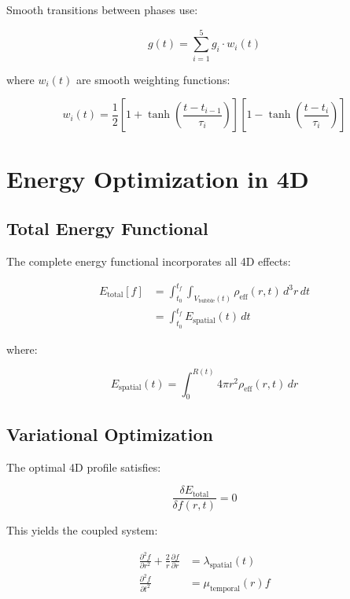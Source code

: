 \documentclass[12pt,a4paper]{article}
\begin{document}
Smooth transitions between phases use:

\begin{equation}
g(t) = \sum_{i=1}^{5} g_i \cdot w_i(t)
\end{equation}

where $w_i(t)$ are smooth weighting functions:

\begin{equation}
w_i(t) = \frac{1}{2}\left[1 + \tanh\left(\frac{t - t_{i-1}}{\tau_i}\right)\right]\left[1 - \tanh\left(\frac{t - t_i}{\tau_i}\right)\right]
\end{equation}

\section{Energy Optimization in 4D}

\subsection{Total Energy Functional}

The complete energy functional incorporates all 4D effects:

\begin{align}
E_{\text{total}}[f] &= \int_{t_0}^{t_f} \int_{V_{\text{bubble}}(t)} \rho_{\text{eff}}(r,t) \, d^3r \, dt \\
&= \int_{t_0}^{t_f} E_{\text{spatial}}(t) \, dt
\end{align}

where:

\begin{equation}
E_{\text{spatial}}(t) = \int_0^{R(t)} 4\pi r^2 \rho_{\text{eff}}(r,t) \, dr
\end{equation}

\subsection{Variational Optimization}

The optimal 4D profile satisfies:

\begin{equation}
\frac{\delta E_{\text{total}}}{\delta f(r,t)} = 0
\end{equation}

This yields the coupled system:

\begin{align}
\frac{\partial^2 f}{\partial r^2} + \frac{2}{r}\frac{\partial f}{\partial r} &= \lambda_{\text{spatial}}(t) \\
\frac{\partial^2 f}{\partial t^2} &= \mu_{\text{temporal}}(r) f
\end{align}
\end{document}
